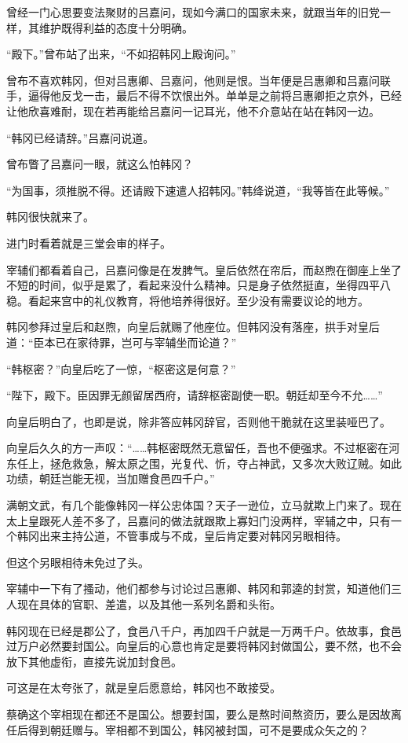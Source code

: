曾经一门心思要变法聚财的吕嘉问，现如今满口的国家未来，就跟当年的旧党一样，其维护既得利益的态度十分明确。

“殿下。”曾布站了出来，“不如招韩冈上殿询问。”

曾布不喜欢韩冈，但对吕惠卿、吕嘉问，他则是恨。当年便是吕惠卿和吕嘉问联手，逼得他反戈一击，最后不得不饮恨出外。单单是之前将吕惠卿拒之京外，已经让他欣喜难耐，现在若再能给吕嘉问一记耳光，他不介意站在站在韩冈一边。

“韩冈已经请辞。”吕嘉问说道。

曾布瞥了吕嘉问一眼，就这么怕韩冈？

“为国事，须推脱不得。还请殿下速遣人招韩冈。”韩绛说道，“我等皆在此等候。”

韩冈很快就来了。

进门时看着就是三堂会审的样子。

宰辅们都看着自己，吕嘉问像是在发脾气。皇后依然在帘后，而赵煦在御座上坐了不短的时间，似乎是累了，看起来没什么精神。只是身子依然挺直，坐得四平八稳。看起来宫中的礼仪教育，将他培养得很好。至少没有需要议论的地方。

韩冈参拜过皇后和赵煦，向皇后就赐了他座位。但韩冈没有落座，拱手对皇后道：“臣本已在家待罪，岂可与宰辅坐而论道？”

“韩枢密？”向皇后吃了一惊，“枢密这是何意？”

“陛下，殿下。臣因罪无颜留居西府，请辞枢密副使一职。朝廷却至今不允……”

向皇后明白了，也即是说，除非答应韩冈辞官，否则他干脆就在这里装哑巴了。

向皇后久久的方一声叹：“……韩枢密既然无意留任，吾也不便强求。不过枢密在河东任上，拯危救急，解太原之围，光复代、忻，夺占神武，又多次大败辽贼。如此功绩，朝廷岂能无视，当加赠食邑四千户。”

满朝文武，有几个能像韩冈一样公忠体国？天子一逊位，立马就欺上门来了。现在太上皇跟死人差不多了，吕嘉问的做法就跟欺上寡妇门没两样，宰辅之中，只有一个韩冈出来主持公道，不管事成与不成，皇后肯定要对韩冈另眼相待。

但这个另眼相待未免过了头。

宰辅中一下有了搔动，他们都参与讨论过吕惠卿、韩冈和郭逵的封赏，知道他们三人现在具体的官职、差遣，以及其他一系列名爵和头衔。

韩冈现在已经是郡公了，食邑八千户，再加四千户就是一万两千户。依故事，食邑过万户必然要封国公。向皇后的心意也肯定是要将韩冈封做国公，要不然，也不会放下其他虚衔，直接先说加封食邑。

可这是在太夸张了，就是皇后愿意给，韩冈也不敢接受。

蔡确这个宰相现在都还不是国公。想要封国，要么是熬时间熬资历，要么是因故离任后得到朝廷赠与。宰相都不到国公，韩冈被封国，可不是要成众矢之的？

